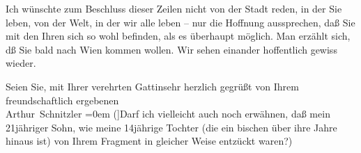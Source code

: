 \pstart
           Ich wünschte zum Beschluss dieser Zeilen {\pb}nicht von der Stadt reden,
               in der Sie leben, von der Welt, in der wir alle leben – nur die Hoffnung aussprechen,
               daß Sie mit den Ihren sich so wohl befinden, als es überhaupt möglich. Man erzählt
               sich, dß Sie bald nach Wien kommen wollen. Wir
               sehen einander hoffentlich gewiss wieder.\pend
           
\pstart
           Seien Sie, mit Ihrer verehrten Gattinsehr herzlich gegrüßt von Ihrem{\\[\baselineskip]}freundschaftlich ergebenen{\\[\baselineskip]}\spacefill\mbox{Arthur Schnitzler}\pend
           \leftskip=0em{}
\pstart
           \noindent{}{[}({]}Darf ich vielleicht auch noch erwähnen, daß mein 21jähriger
                     Sohn, wie meine
                  14jährige Tochter (die ein
                  bischen über ihre Jahre hinaus ist) von Ihrem Fragment in gleicher Weise entzückt waren?) \pend
           \endnumbering{}  
      